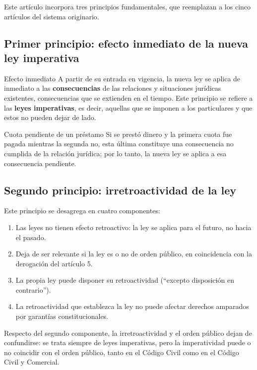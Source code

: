 \documentclass[12pt,oneside]{book}
\begin{document}
Este artículo incorpora tres principios fundamentales, que reemplazan a los cinco artículos del sistema originario.

\subsection{Primer principio: efecto inmediato de la nueva ley imperativa}

\begin{definition}{Efecto inmediato}
A partir de su entrada en vigencia, la nueva ley se aplica de inmediato a las \textbf{consecuencias} de las relaciones y situaciones jurídicas existentes, consecuencias que se extienden en el tiempo. Este principio se refiere a las \textbf{leyes imperativas}, es decir, aquellas que se imponen a los particulares y que estos no pueden dejar de lado.
\end{definition}

\begin{example}{Cuota pendiente de un préstamo}
Si se prestó dinero y la primera cuota fue pagada mientras la segunda no, esta última constituye una consecuencia no cumplida de la relación jurídica; por lo tanto, la nueva ley se aplica a esa consecuencia pendiente.
\end{example}

\subsection{Segundo principio: irretroactividad de la ley}

Este principio se desagrega en cuatro componentes:

\begin{enumerate}
    \item Las leyes no tienen efecto retroactivo: la ley se aplica para el futuro, no hacia el pasado.
    \item Deja de ser relevante si la ley es o no de orden público, en coincidencia con la derogación del artículo 5.
    \item La propia ley puede disponer su retroactividad (``excepto disposición en contrario'').
    \item La retroactividad que establezca la ley no puede afectar derechos amparados por garantías constitucionales.
\end{enumerate}

Respecto del segundo componente, la irretroactividad y el orden público dejan de confundirse: se trata siempre de leyes imperativas, pero la imperatividad puede o no coincidir con el orden público, tanto en el Código Civil como en el Código Civil y Comercial.
\end{document}
